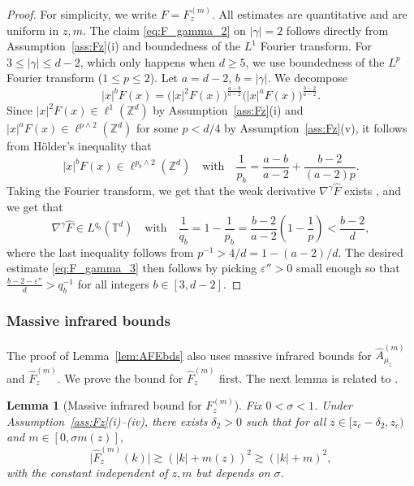 \documentclass[11pt,hidelinks]{article}
\theoremstyle{plain}
\newtheorem{lemma}[theorem]{Lemma}
\numberwithin{equation}{section}
\newcommand{\eps}{\varepsilon}
\newcommand{\Z}{\mathbb{Z}}
\newcommand{\T}{\mathbb{T}}
\newcommand{\grad}{\nabla}
\newcommand{\inv}{^{-1}}
\renewcommand{\(}{\left(}
\renewcommand{\)}{\right)}
\newcommand{\1}{\mathds{1}}
\providecommand{\abs}[1]{\lvert#1\rvert}
\newcommand{\mz}{m(z)}
\newcommand{\muz}{{\mu_z}}
\newcommand{\supm}{^{(m)}}
\begin{document}
\begin{proof}
For simplicity, we write $F = F_z\supm$. All estimates are quantitative and are uniform in $z,m$. 
The claim \eqref{eq:F_gamma_2} on $\abs \gamma=2$ follows directly from Assumption~\ref{ass:Fz}(i) and boundedness of the $L^1$ Fourier transform. 
For $3 \le \abs \gamma \le d-2$, which only happens when $d\ge 5$, 
we use boundedness of the $L^p$ Fourier transform ($1\le p \le 2$). 
Let $a = d-2$, $b = \abs \gamma$. We decompose
\begin{equation}
\abs x^b F(x) =  \big( \abs x^{ 2 } F(x) \big)^{ \frac{a-b}{a-2} } 
	\big( \abs x^{ a } F(x) \big)^{ \frac{b-2}{a-2} }.
\end{equation}
Since $\abs x^2 F(x) \in \ell^1(\Z^d)$ by Assumption~\ref{ass:Fz}(i) and $\abs x^a F(x) \in \ell^{p \wedge 2 }(\Z^d)$ for some $p < d/4$ by Assumption~\ref{ass:Fz}(v), 
it follows from H\"older's inequality that
\begin{equation}
\abs x^b F(x) \in \ell^{p_b \wedge 2}(\Z^d)
\quad \text{with} \quad
\frac 1 {p_b} = \frac{ a-b }{a-2} + \frac { b-2 }{ (a-2)p }. 
\end{equation}
Taking the Fourier transform, we get that the weak derivative $\grad^\gamma \hat F$ exists \cite[Lemma~A.4]{LS24a}, and we get that
\begin{equation}
\grad^\gamma \hat F \in L^{q_b}(\T^d)
\quad \text{with} \quad
\frac 1 {q_b} = 1 - \frac 1 {p_b}
	= \frac { b-2 }{ a-2 } \( 1 - \frac 1 p \)
	< \frac{ b-2}d,
\end{equation}
where the last inequality follows from $p\inv > 4 / d = 1 - (a-2)/d$. 
The desired estimate \eqref{eq:F_gamma_3} then follows by picking $\eps''>0$ small enough so that $\frac{ b - 2 - \eps'' }d > q_b\inv$ for all integers $b \in [3, d-2]$. 
\end{proof}



\subsubsection*{Massive infrared bounds}
The proof of Lemma~\ref{lem:AFEbds} also uses massive infrared bounds for $\hat A_\muz\supm$ and $\hat F_z\supm$. 
We prove the bound for $\hat F_z\supm$ first. 
The next lemma is related to \cite[Lemma~5.2]{Slad23_wsaw}. 

\begin{lemma}[Massive infrared bound for $F_z\supm$]
\label{lem:massive_infrared}
Fix $0 < \sigma < 1$. 
Under Assumption~\ref{ass:Fz}(i)--(iv),
there exists $\delta_2 >0$ such that for all $z \in [ z_c - \delta_2, z_c )$ and $m \in [0,\sigma \mz]$, 
\begin{equation}
\label{eq:Fm_lb}
\abs{ \hat F_z \supm (k) } 
\gtrsim (\abs k + \mz )^2
\gtrsim (\abs k  + m)^2,
\end{equation}
with the constant independent of $z,m$ but depends on $\sigma$. 
\end{lemma}
\end{document}
